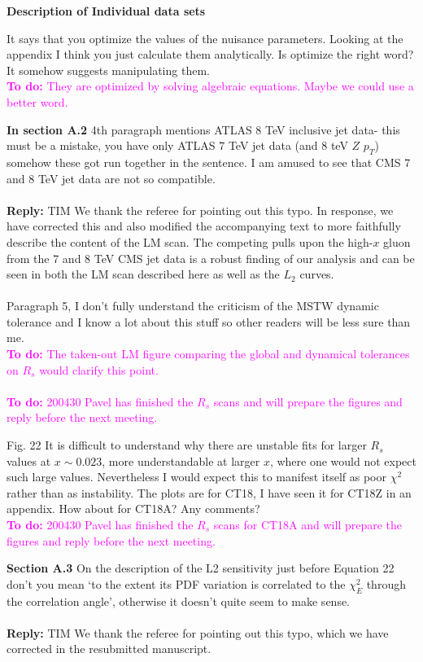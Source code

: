 \documentclass[aps,prd,amsmath,nofootinbib,floatfix,fleqn]{revtex4}
\newcommand{\TODO}[1]{\textcolor{magenta}{
\quad\vspace{3pt} \\ {\bf To do:} #1 \\
}}
\newcommand{\REPLY}[1]{\textcolor{redish}{\quad \\
{\bf Reply:} #1 \\
}}
\begin{document}
{\bf Description of Individual data sets}

It says that you optimize the values of the nuisance parameters. Looking at the appendix I think you just calculate them analytically. Is optimize the right word? It somehow suggests manipulating them.
\TODO{They are optimized by solving algebraic equations. Maybe we could use a better word.}

\noindent
{\bf In section A.2} 4th paragraph mentions ATLAS 8 TeV inclusive jet data- this must be a mistake, you have only ATLAS 7 TeV jet data (and 8 teV $Z$ $p_T$) somehow these got run together in the sentence.
I am amused to see that CMS 7 and 8 TeV jet data are not so compatible. \\
%
\REPLY{TIM We thank the referee for pointing out this typo.  In response, we have corrected
this and also modified the accompanying text to more faithfully describe the content of the LM scan. The competing pulls upon the high-$x$ gluon from the 7 and 8 TeV CMS jet data is a robust finding of our analysis and can be seen in both the LM scan described here as well as the $L_2$ curves.}\\

\noindent
Paragraph 5, I don’t fully understand the criticism of the MSTW dynamic tolerance and I know a lot about this stuff so other readers will be less sure than me. 
\TODO{The taken-out LM figure comparing the global and dynamical tolerances on $R_s$ would clarify this point.}
\TODO{200430 Pavel has finished the $R_s$ scans and will prepare the figures and reply before the next meeting.}

\noindent
Fig. 22 It is difficult to understand why there are unstable fits for larger $R_s$ values at $x \sim 0.023$, more understandable at larger $x$, where one would not expect such large values. Nevertheless I would expect this to manifest itself as poor $\chi^2$ rather than as instability. The plots are for CT18, I have seen it for CT18Z in an appendix. How about for CT18A? Any comments?
\TODO{200430 Pavel has finished the $R_s$ scans for CT18A and will prepare the figures and reply before the next meeting.}



\noindent
{\bf Section A.3} On the description of the L2 sensitivity just before Equation 22 don’t you mean ‘to the extent its PDF variation is correlated to the $\chi^2_E$ through the correlation angle’, otherwise it doesn’t quite seem to make sense.\\
\REPLY{TIM We thank the referee for pointing out this typo, which we have corrected in the resubmitted manuscript.}\\
\end{document}
